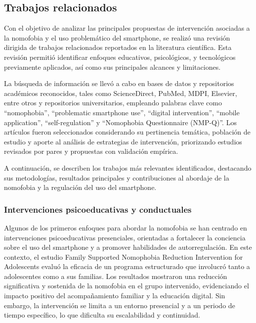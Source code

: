 \subsection{Trabajos relacionados}

Con el objetivo de analizar las principales propuestas de intervención asociadas a la nomofobia y el uso problemático del smartphone, se realizó una revisión dirigida de trabajos relacionados reportados en la literatura científica. Esta revisión permitió identificar enfoques educativos, psicológicos, y tecnológicos previamente aplicados, así como sus principales alcances y limitaciones.

La búsqueda de información se llevó a cabo en bases de datos y repositorios académicos reconocidos, tales como ScienceDirect, PubMed, MDPI, Elsevier, entre otros y repositorios universitarios, empleando palabras clave como “nomophobia”, “problematic smartphone use”, “digital intervention”, “mobile application”, “self-regulation” y “Nomophobia Questionnaire (NMP-Q)”. Los artículos fueron seleccionados considerando su pertinencia temática, población de estudio y aporte al análisis de estrategias de intervención, priorizando estudios revisados por pares y propuestas con validación empírica.

A continuación, se describen los trabajos más relevantes identificados, destacando sus metodologías, resultados principales y contribuciones al abordaje de la nomofobia y la regulación del uso del smartphone.

\subsubsection{Intervenciones psicoeducativas y conductuales}

Algunos de los primeros enfoques para abordar la nomofobia se han centrado en intervenciones psicoeducativas presenciales, orientadas a fortalecer la conciencia sobre el uso del smartphone y a promover habilidades de autorregulación. En este contexto, el estudio Family Supported Nomophobia Reduction Intervention for Adolescents \cite{CelikKucukKulaberoglu2024} evaluó la eficacia de un programa estructurado que involucró tanto a adolescentes como a sus familias. Los resultados mostraron una reducción significativa y sostenida de la nomofobia en el grupo intervenido, evidenciando el impacto positivo del acompañamiento familiar y la educación digital. Sin embargo, la intervención se limita a un entorno presencial y a un periodo de tiempo específico, lo que dificulta su escalabilidad y continuidad.

